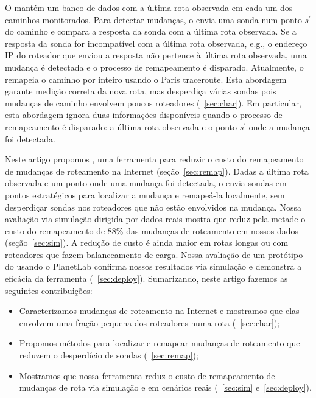 O \dtrack{} mantém um banco de dados com a última rota observada em cada
um dos caminhos monitorados.  Para detectar mudanças, o \dtrack{} envia
uma sonda num ponto $s^\prime$ do caminho e compara a resposta da sonda
com a última rota observada.  Se a resposta da sonda for incompatível
com a última rota observada, e.g., o endereço IP do roteador que enviou
a resposta não pertence à última rota observada, uma mudança é detectada
e o processo de remapeamento é disparado.  Atualmente, o \dtrack{}
remapeia o caminho por inteiro usando o Paris traceroute.  Esta
abordagem garante medição correta da nova rota, mas desperdiça várias
sondas pois mudanças de caminho envolvem poucos roteadores
(\secstr~\ref{sec:char}).  Em particular, esta abordagem ignora duas
informações disponíveis quando o processo de remapeamento é disparado: a
última rota observada e o ponto $s^\prime$ onde a mudança foi detectada.

Neste artigo propomos \rmprt{}, uma ferramenta para reduzir o custo do
remapeamento de mudanças de roteamento na Internet
(seção~\ref{sec:remap}).  Dadas a última rota observada e um ponto onde
uma mudança foi detectada, o \rmprt{} envia sondas em pontos
estratégicos para localizar a mudança e remapeá-la localmente, sem
desperdiçar sondas nos roteadores que não estão envolvidos na mudança.
Nossa avaliação via simulação dirigida por dados reais mostra que
\rmprt{} reduz pela metade o custo do remapeamento de 88\% das mudanças
de roteamento em nossos dados (seção~\ref{sec:sim}).  A redução de custo
é ainda maior em rotas longas ou com roteadores que fazem balanceamento
de carga.  Nossa avaliação de um protótipo do \rmprt{} usando o
PlanetLab confirma nossos resultados via simulação e demonstra a
eficácia da ferramenta (\secstr~\ref{sec:deploy}).  Sumarizando, neste
artigo fazemos as seguintes contribuições:

\begin{itemize}

\item Caracterizamos mudanças de roteamento na Internet e mostramos que
elas envolvem uma fração pequena dos roteadores numa rota
(\secstr~\ref{sec:char});

\item Propomos métodos para localizar e remapear mudanças de roteamento
que reduzem o desperdício de sondas (\secstr~\ref{sec:remap});

\pagebreak{}
\item Mostramos que nossa ferramenta reduz o custo de remapeamento de
mudanças de rota via simulação e em cenários reais
(\secstrs~\ref{sec:sim} e~\ref{sec:deploy}).

\end{itemize}

